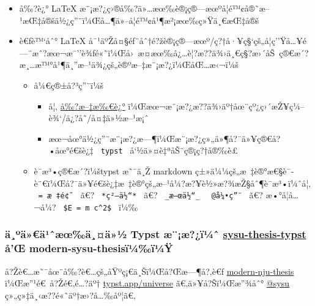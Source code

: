 \begin{itemize}
\tightlist
\item
  å‰?è¿° LaTeX
  æ¨¡æ?¿ç›®å‰?ä»\ldots æœ‰è®¡ç®---æœºå­¦é™¢å®˜æ--¹æŒ‡å®šä½¿ç''¨ï¼Œå\ldots¶ä»--å­¦é™¢å¹¶æ²¡æœ‰ç»Ÿä¸€æŒ‡å®š
\item
  è€ƒè™`åˆ° LaTeX
  å¯¹äºŽå¤§éƒ¨åˆ†é?žè®¡ç®---æœº/ç?†å·¥ç§`çš„å­¦ç''Ÿå\ldots¥é---¨æˆ?æœ¬æ¯''è¾ƒé«˜ï¼Œå›~æ­¤æœ‰å¿\ldots è¦?æ??ä¾›ä¸€ç§?æ›´åŠ~ç®€æ´?æ¸\ldots æ™°å¹¶ä¸''æ--¹ä¾¿çš„è®ºæ--‡æ¨¡æ?¿ï¼ŒåŒ\ldots æ‹¬ï¼š

  \begin{itemize}
  \tightlist
  \item
    å¼€ç®±å?³ç''¨ï¼š

    \begin{itemize}
    \tightlist
    \item
      å¦‚
      \href{https://github.com/typst/packages/raw/main/packages/preview/modern-sysu-thesis/0.3.0/\#typstapp}{å‰?æ--‡æ‰€è¿°}
      ï¼Œæœ¬æ¨¡æ?¿æ??ä¾›äº†åœ¨çº¿ç›´æŽ¥ç¼--è¾`/ä¿?å­˜/å¤‡ä»½æ--¹æ¡ˆ
    \item
      æœ¬åœ°ä½¿ç''¨æ¨¡æ?¿æ---¶ï¼Œæ¨¡æ?¿ç»„ä»¶å?¯ä»¥ç®€å?•åœ°é€šè¿‡
      \texttt{\ typst\ } å`½ä»¤è‡ªåŠ¨ç®¡ç?†å®‰è£
    \end{itemize}
  \item
    è¯­æ³•ç®€æ´?ï¼štypst æ˜¯ä¸Ž markdown
    ç±»ä¼¼çš„æ~‡è®°æ€§è¯­è¨€ï¼Œå?¯ä»¥é€šè¿‡æ~‡è®°çš„æ--¹å¼?æ?¥è½»æ?¾æŽ§åˆ¶è¯­æ³•ï¼ˆå¦‚
    \texttt{\ =\ æ~‡é¢˜\ } ã€? \texttt{\ *ç²—ä½“*\ } ã€?
    \texttt{\ \_æ–œä½“\_\ } \texttt{\ @å¼•ç”¨\ } ã€? æ•°å­¦å\ldots¬å¼?
    \texttt{\ \$E\ =\ m\ c\^{}2\$\ } ï¼‰
  \end{itemize}
\end{itemize}

\subsubsection{\texorpdfstring{ä¸ºä»€ä¹ˆæœ‰ä¸¤ä»½ Typst æ¨¡æ?¿ï¼ˆ
\href{https://github.com/howardlau1999/sysu-thesis-typst}{sysu-thesis-typst}
å'Œ
modern-sysu-thesisï¼‰ï¼Ÿ}{ä¸ºä»€ä¹ˆæœ‰ä¸¤ä»½ Typst æ¨¡æ?¿ï¼ˆ sysu-thesis-typst å'Œ modern-sysu-thesisï¼‰ï¼Ÿ}}\label{uxe4uxbauxe4uxe4uxb9ux2c6uxe6ux153uxe4uxe4uxbd-typst-uxe6uxe6uxefuxbcux2c6-sysu-thesis-typst-uxe5ux153-modern-sysu-thesisuxefuxbcuxefuxbcuxff}

å?Žè€\ldots æ˜¯åœ¨å‰?è€\ldots çš„åŸºç¡€ä¸Šï¼Œå?Œæ---¶å?‚è€ƒ
\href{https://typst.app/universe/package/modern-nju-thesis}{modern-nju-thesis}
ï¼Œæ''¹é€~å?Žé€‚é\ldots?äº†
\href{https://typst.app/universe}{typst.app/universe}
ã€‚ä»¥å?Šï¼Œæ''¾åˆ° \href{https://github.com/sysu}{@sysu}
ç»„ç»‡ä¸‹æ??é«˜äº†æ›?å\ldots‰åº¦ã€‚

